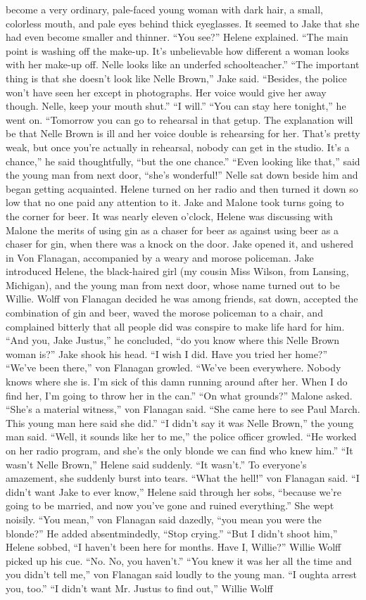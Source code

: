 \documentclass{novel}
\begin{document}
become a very ordinary, pale-faced young woman with dark hair, a small, colorless mouth, and pale eyes behind thick eyeglasses. It seemed to Jake that she had even become smaller and thinner. “You see?” Helene explained. “The main point is washing off the make-up. It’s unbelievable how different a woman looks with her make-up off. Nelle looks like an underfed schoolteacher.” “The important thing is that she doesn’t look like Nelle Brown,” Jake said. “Besides, the police won’t have seen her except in photographs. Her voice would give her away though. Nelle, keep your mouth shut.” “I will.” “You can stay here tonight,” he went on. “Tomorrow you can go to rehearsal in that getup. The explanation will be that Nelle Brown is ill and her voice double is rehearsing for her. That’s pretty weak, but once you’re actually in rehearsal, nobody can get in the studio. It’s a chance,” he said thoughtfully, “but the one chance.” “Even looking like that,” said the young man from next door, “she’s wonderful!” Nelle sat down beside him and began getting acquainted. Helene turned on her radio and then turned it down so low that no one paid any attention to it. Jake and Malone took turns going to the corner for beer. It was nearly eleven o’clock, Helene was discussing with Malone the merits of using gin as a chaser for beer as against using beer as a chaser for gin, when there was a knock on the door. Jake opened it, and ushered in Von Flanagan, accompanied by a weary and morose policeman. Jake introduced Helene, the black-haired girl (my cousin Miss Wilson, from Lansing, Michigan), and the young man from next door, whose name turned out to be Willie. Wolff von Flanagan decided he was among friends, sat down, accepted the combination of gin and beer, waved the morose policeman to a chair, and complained bitterly that all people did was conspire to make life hard for him. “And you, Jake Justus,” he concluded, “do you know where this Nelle Brown woman is?” Jake shook his head. “I wish I did. Have you tried her home?” “We’ve been there,” von Flanagan growled. “We’ve been everywhere. Nobody knows where she is. I’m sick of this damn running around after her. When I do find her, I’m going to throw her in the can.” “On what grounds?” Malone asked. “She’s a material witness,” von Flanagan said. “She came here to see Paul March. This young man here said she did.” “I didn’t say it was Nelle Brown,” the young man said. “Well, it sounds like her to me,” the police officer growled. “He worked on her radio program, and she’s the only blonde we can find who knew him.” “It wasn’t Nelle Brown,” Helene said suddenly. “It wasn’t.” To everyone’s amazement, she suddenly burst into tears. “What the hell!” von Flanagan said. “I didn’t want Jake to ever know,” Helene said through her sobs, “because we’re going to be married, and now you’ve gone and ruined everything.” She wept noisily. “You mean,” von Flanagan said dazedly, “you mean you were the blonde?” He added absentmindedly, “Stop crying.” “But I didn’t shoot him,” Helene sobbed, “I haven’t been here for months. Have I, Willie?” Willie Wolff picked up his cue. “No. No, you haven’t.” “You knew it was her all the time and you didn’t tell me,” von Flanagan said loudly to the young man. “I oughta arrest you, too.” “I didn’t want Mr. Justus to find out,” Willie Wolff 
\end{document}
